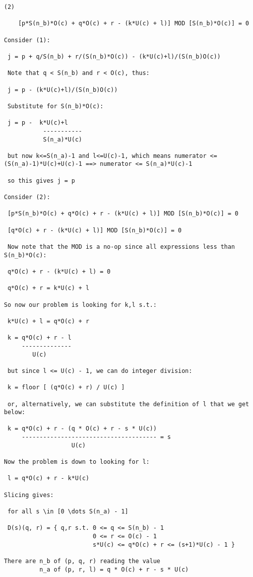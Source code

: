 \begin{verbatim}
(2) 

    [p*S(n_b)*O(c) + q*O(c) + r - (k*U(c) + l)] MOD [S(n_b)*O(c)] = 0

Consider (1):

 j = p + q/S(n_b) + r/(S(n_b)*O(c)) - (k*U(c)+l)/(S(n_b)O(c))

 Note that q < S(n_b) and r < O(c), thus:
      
 j = p - (k*U(c)+l)/(S(n_b)O(c))

 Substitute for S(n_b)*O(c):

 j = p -  k*U(c)+l
           -----------
           S(n_a)*U(c)

 but now k<=S(n_a)-1 and l<=U(c)-1, which means numerator <= (S(n_a)-1)*U(c)+U(c)-1 ==> numerator <= S(n_a)*U(c)-1

 so this gives j = p

Consider (2):

 [p*S(n_b)*O(c) + q*O(c) + r - (k*U(c) + l)] MOD [S(n_b)*O(c)] = 0

 [q*O(c) + r - (k*U(c) + l)] MOD [S(n_b)*O(c)] = 0

 Now note that the MOD is a no-op since all expressions less than S(n_b)*O(c):

 q*O(c) + r - (k*U(c) + l) = 0

 q*O(c) + r = k*U(c) + l

So now our problem is looking for k,l s.t.:

 k*U(c) + l = q*O(c) + r

 k = q*O(c) + r - l
     --------------
        U(c)

 but since l <= U(c) - 1, we can do integer division:
 
 k = floor [ (q*O(c) + r) / U(c) ]

 or, alternatively, we can substitute the definition of l that we get below:

 k = q*O(c) + r - (q * O(c) + r - s * U(c))   
     -------------------------------------- = s
                   U(c)

Now the problem is down to looking for l:

 l = q*O(c) + r - k*U(c)

Slicing gives:

 for all s \in [0 \dots S(n_a) - 1]

 D(s)(q, r) = { q,r s.t. 0 <= q <= S(n_b) - 1
                         0 <= r <= O(c) - 1
                         s*U(c) <= q*O(c) + r <= (s+1)*U(c) - 1 }

There are n_b of (p, q, r) reading the value
          n_a of (p, r, l) = q * O(c) + r - s * U(c)


\end{verbatim}
